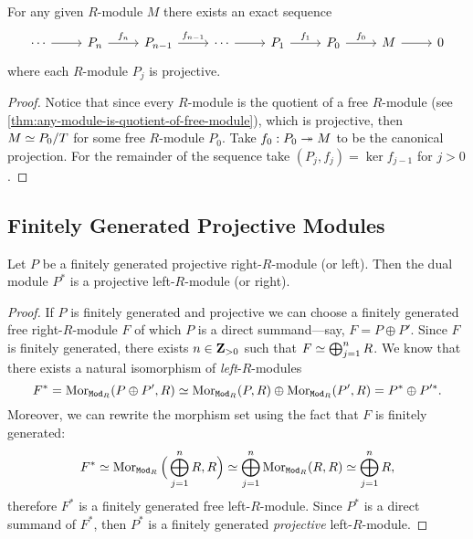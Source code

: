 \begin{theorem}
\label{thm:projective-resolution}
For any given \(R\)-module \(M\) there exists an exact sequence
\[
\begin{tikzcd}
\cdots \ar[r]
&P_n \ar[r, "f_n"]
&P_{n-1} \ar[r, "f_{n-1}"]
&\cdots \ar[r]
&P_1 \ar[r, "f_1"]
&P_0 \ar[r, "f_0"]
&M \ar[r]
&0
\end{tikzcd}
\]
where each \(R\)-module \(P_j\) is projective.
\end{theorem}

\begin{proof}
Notice that since every \(R\)-module is the quotient of a free \(R\)-module (see
\cref{thm:any-module-is-quotient-of-free-module}), which is projective, then
\(M \simeq P_0/T\) for some free \(R\)-module \(P_0\). Take \(f_0: P_0 \twoheadrightarrow M\) to
be the canonical projection. For the remainder of the sequence take
\((P_j, f_j) = \ker f_{j-1}\) for \(j > 0\).
\end{proof}

\subsection{Finitely Generated Projective Modules}

\begin{proposition}
\label{prop:fg-projective-then-dual-module-is-projective}
Let \(P\) be a finitely generated projective right-\(R\)-module (or left). Then
the dual module \(P^{*}\) is a projective left-\(R\)-module (or right).
\end{proposition}

\begin{proof}
If \(P\) is finitely generated and projective we can choose a finitely generated
free right-\(R\)-module \(F\) of which \(P\) is a direct summand---say, \(F = P
\oplus P'\). Since \(F\) is finitely generated, there exists \(n \in \mathbf{Z}_{> 0}\)
such that \(F \simeq \bigoplus_{j=1}^n R\). We know that there exists a natural
isomorphism of \emph{left}-\(R\)-modules
\[
F^{*} = \operatorname{Mor}_{{\texttt{Mod}_{R}}}(P \oplus P', R)
\simeq \operatorname{Mor}_{{\texttt{Mod}_{R}}}(P, R) \oplus \operatorname{Mor}_{{\texttt{Mod}_{R}}}(P', R)
= P^{*} \oplus P'^{*}.
\]
Moreover, we can rewrite the morphism set using the fact that \(F\) is finitely
generated:
\[
F^{*} \simeq \operatorname{Mor}_{{\texttt{Mod}_{R}}}\Big(\bigoplus_{j=1}^n R, R\Big)
\simeq \bigoplus_{j=1}^n \operatorname{Mor}_{{\texttt{Mod}_{R}}}(R, R)
\simeq \bigoplus_{j=1}^n R,
\]
therefore \(F^{*}\) is a finitely generated free left-\(R\)-module. Since
\(P^{*}\) is a direct summand of \(F^{*}\), then \(P^{*}\) is a finitely
generated \emph{projective} left-\(R\)-module.
\end{proof}

